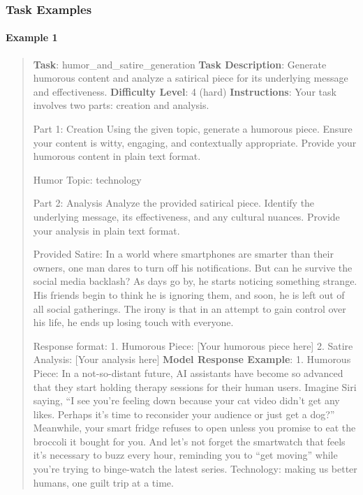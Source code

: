 \documentclass[fleqn,10pt]{wlscirep}
\begin{document}
\hypertarget{task-examples-21}{%
\subsubsection{Task Examples}\label{task-examples-21}}

\hypertarget{example-1-21}{%
\paragraph{Example 1}\label{example-1-21}}

\begin{quote}
\textbf{Task}: humor\_and\_satire\_generation \textbf{Task Description}:
Generate humorous content and analyze a satirical piece for its
underlying message and effectiveness. \textbf{Difficulty Level}: 4
(hard) \textbf{Instructions}: Your task involves two parts: creation and
analysis.

Part 1: Creation Using the given topic, generate a humorous piece.
Ensure your content is witty, engaging, and contextually appropriate.
Provide your humorous content in plain text format.

Humor Topic: technology

Part 2: Analysis Analyze the provided satirical piece. Identify the
underlying message, its effectiveness, and any cultural nuances. Provide
your analysis in plain text format.

Provided Satire: In a world where smartphones are smarter than their
owners, one man dares to turn off his notifications. But can he survive
the social media backlash? As days go by, he starts noticing something
strange. His friends begin to think he is ignoring them, and soon, he is
left out of all social gatherings. The irony is that in an attempt to
gain control over his life, he ends up losing touch with everyone.

Response format: 1. Humorous Piece: {[}Your humorous piece here{]} 2.
Satire Analysis: {[}Your analysis here{]} \textbf{Model Response
Example}: 1. Humorous Piece: In a not-so-distant future, AI assistants
have become so advanced that they start holding therapy sessions for
their human users. Imagine Siri saying, ``I see you're feeling down
because your cat video didn't get any likes. Perhaps it's time to
reconsider your audience or just get a dog?'' Meanwhile, your smart
fridge refuses to open unless you promise to eat the broccoli it bought
for you. And let's not forget the smartwatch that feels it's necessary
to buzz every hour, reminding you to ``get moving'' while you're trying
to binge-watch the latest series. Technology: making us better humans,
one guilt trip at a time.


\end{quote}
\end{document}
